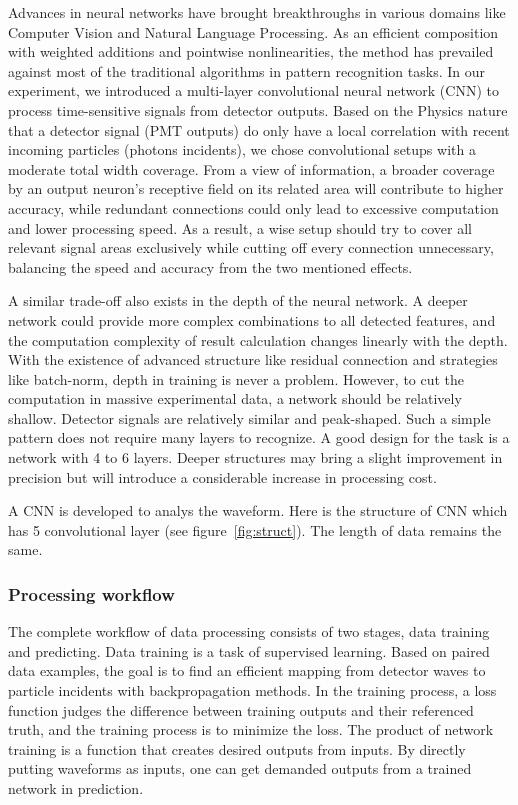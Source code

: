 Advances in neural networks have brought breakthroughs in various domains like Computer Vision and Natural Language Processing. As an efficient composition with weighted additions and pointwise nonlinearities, the method has prevailed against most of the traditional algorithms in pattern recognition tasks. In our experiment, we introduced a multi-layer convolutional neural network (CNN) to process time-sensitive signals from detector outputs. Based on the Physics nature that a detector signal (PMT outputs) do only have a local correlation with recent incoming particles (photons incidents), we chose convolutional setups with a moderate total width coverage. From a view of information, a broader coverage by an output neuron's receptive field on its related area will contribute to higher accuracy, while redundant connections could only lead to excessive computation and lower processing speed. As a result, a wise setup should try to cover all relevant signal areas exclusively while cutting off every connection unnecessary, balancing the speed and accuracy from the two mentioned effects.

A similar trade-off also exists in the depth of the neural network. A deeper network could provide more complex combinations to all detected features, and the computation complexity of result calculation changes linearly with the depth. With the existence of advanced structure like residual connection and strategies like batch-norm, depth in training is never a problem. However, to cut the computation in massive experimental data, a network should be relatively shallow. Detector signals are relatively similar and peak-shaped. Such a simple pattern does not require many layers to recognize. A good design for the task is a network with 4 to 6 layers. Deeper structures may bring a slight improvement in precision but will introduce a considerable increase in processing cost.

A CNN is developed to analys the waveform. Here is the structure of CNN which has 5 convolutional layer (see figure~\ref{fig:struct}). The length of data remains the same. 

\subsubsection{Processing workflow}
The complete workflow of data processing consists of two stages, data training and predicting. Data training is a task of supervised learning.  Based on paired data examples, the goal is to find an efficient mapping from detector waves to particle incidents with backpropagation methods. In the training process, a loss function judges the difference between training outputs and their referenced truth, and the training process is to minimize the loss. The product of network training is a function that creates desired outputs from inputs. By directly putting waveforms as inputs, one can get demanded outputs from a trained network in prediction.

